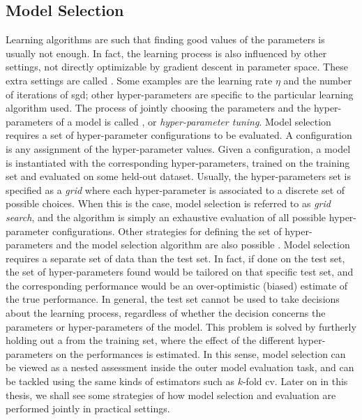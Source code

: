 \subsection{Model Selection}
Learning algorithms are such that finding good values of the parameters is usually not enough. In fact, the learning process is also influenced by other settings, not directly optimizable by gradient descent in parameter space. These extra settings are called . Some examples are the learning rate $\eta$ and the number of iterations of \gls{sgd}; other hyper-parameters are specific to the particular learning algorithm used. The process of jointly choosing the parameters and the hyper-parameters of a model is called , or \emph{hyper-parameter tuning}. Model selection requires a set of hyper-parameter configurations to be evaluated. A configuration is any assignment of the hyper-parameter values. Given a configuration, a model is instantiated with the corresponding hyper-parameters, trained on the training set and evaluated on some held-out dataset. Usually, the hyper-parameters set is specified as a \emph{grid} where each hyper-parameter is associated to a discrete set of possible choices. When this is the case, model selection is referred to as \emph{grid search}, and the algorithm is simply an exhaustive evaluation of all possible hyper-parameter configurations. Other strategies for defining the set of hyper-parameters and the model selection algorithm are also possible \citep{bergstra2009randomsearch,bergstra2012hyperopt}. Model selection requires a separate set of data than the test set. In fact, if done on the test set, the set of hyper-parameters found would be tailored on that specific test set, and the corresponding performance would be an over-optimistic (biased) estimate of the true performance. In general, the test set cannot be used to take decisions about the learning process, regardless of whether the decision concerns the parameters or hyper-parameters of the model. This problem is solved by furtherly holding out a  from the training set, where the effect of the different hyper-parameters on the performances is estimated. In this sense, model selection can be viewed as a nested assessment inside the outer model evaluation task, and can be tackled using the same kinds of estimators such as $k$-fold \gls{cv}. Later on in this thesis, we shall see some strategies of how model selection and evaluation are performed jointly in practical settings.

